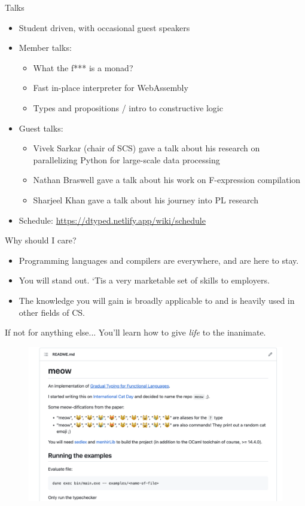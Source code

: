 \documentclass{beamer}
\begin{document}
\begin{frame}{Talks}
  \begin{itemize}
    \item Student driven, with occasional guest speakers
    \item Member talks:
      \begin{itemize}
        \item What the f*** is a monad?
        \item Fast in-place interpreter for WebAssembly
        \item Types and propositions / intro to constructive logic
      \end{itemize}
    \item Guest talks:
      \begin{itemize}
        \item Vivek Sarkar (chair of SCS) gave a talk about his research on parallelizing Python for large-scale data processing
        \item Nathan Braswell gave a talk about his work on F-expression compilation
        \item Sharjeel Khan gave a talk about his journey into PL research
      \end{itemize}
    \item Schedule: \url{https://dtyped.netlify.app/wiki/schedule}
  \end{itemize}
\end{frame}

\begin{frame}{Why should I care?}
  \begin{itemize}
    \item Programming languages and compilers are everywhere, and are here to stay.
    \item You will stand out. `Tis a very marketable set of skills to employers.
    \item The knowledge you will gain is broadly applicable to and is heavily
      used in other fields of CS.
  \end{itemize}
\end{frame}

\begin{frame}{If not for anything else...}
  You'll learn how to give \textit{life} to the inanimate.
  \begin{figure}
  \includegraphics[width=\textwidth]{assets/meow-lang-example}
  \end{figure}
\end{frame}
\end{document}
